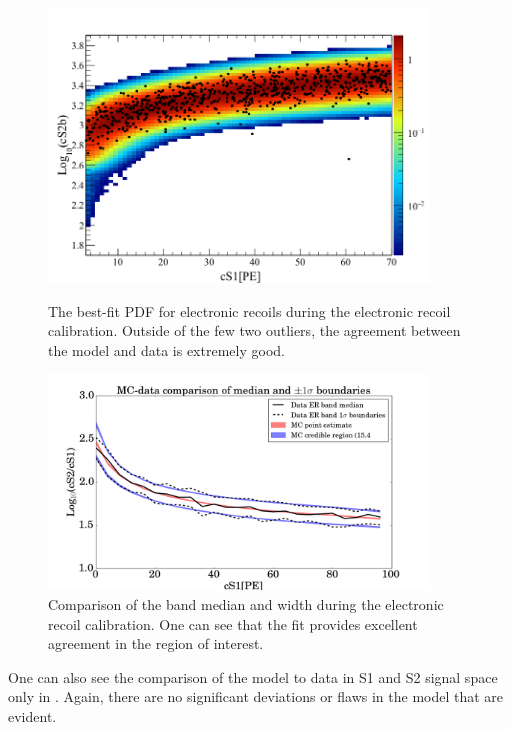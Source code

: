 \begin{figure}[p]
	\centering
	\includegraphics[width=0.9\textwidth]{xe1t_er_pdf_overlaid_data}
	\caption{The best-fit PDF for electronic recoils during the  electronic recoil calibration.  Outside of the few two outliers, the agreement between the model and data is extremely good.}
	\label{fig:xe1t_er_pdf_overlaid_data}
	
	\centering
	\includegraphics[width=0.9\textwidth]{xe1t_er_band_width_median}
	\caption{Comparison of the band median and width during the electronic recoil calibration.  One can see that the fit provides excellent agreement in the region of interest.}
	\label{fig:xe1t_er_band_width_median}
\end{figure}
	
	
One can also see the comparison of the model to data in S1 and S2 signal space only in .  Again, there are no significant deviations or flaws in the model that are evident.
	
